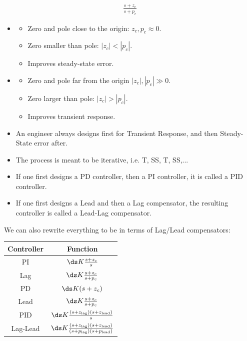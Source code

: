 \documentclass{article}
\begin{document}
\begin{align*}
  \frac{s + z_c}{s + p_c}
\end{align*}
\begin{itemize}
\item {}
  \begin{itemize}
  \item Zero and pole close to the origin: $z_c, p_c \approx 0$.
  \item Zero smaller than pole: $|z_c| < |p_c|$.
  \item Improves steady-state error.
  \end{itemize}
\item {}
  \begin{itemize}
  \item Zero and pole far from the origin $|z_c|, |p_c| \gg 0$.
  \item Zero larger than pole: $|z_c| > |p_c|$.
  \item Improves transient response.
  \end{itemize}
\end{itemize}
\begin{itemize}
\item An engineer always designs first for Transient Response, and then Steady-State error after.
\item The process is meant to be iterative, i.e. T, SS, T, SS,...
\item If one first designs a PD controller, then a PI controller, it is called a PID controller.
\item If one first designs a Lead and then a Lag compensator, the resulting controller is called a Lead-Lag compensator.
\end{itemize}

We can also rewrite everything to be in terms of Lag/Lead compensators:

\begin{center}
\renewcommand{\arraystretch}{2} %
\begin{tabular}{|c|c|}
\hline
\textbf{Controller} & \textbf{Function} \\
\hline
PI & $\ds K \frac{s + z_c}{s}$ \\
\hline
Lag & $\ds K \frac{s + z_c}{s + p_c}$ \\
\hline
PD & $\ds K (s + z_c)$ \\
\hline
Lead & $\ds K \frac{s + z_c}{s + p_c}$ \\
\hline
PID & $\ds K \frac{(s + z_\text{lag})(s + z_\text{lead})}{s}$ \\
\hline
Lag-Lead & $\ds K \frac{(s + z_\text{lag})(s + z_\text{lead})}{(s + p_\text{lag}) (s + p_\text{lead})}$\\
\hline
\end{tabular}
\end{center}
\end{document}
